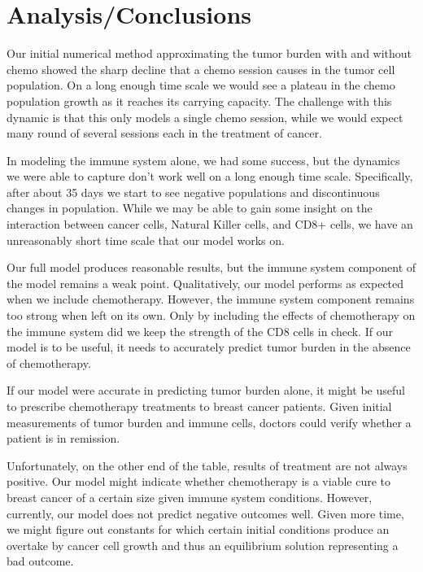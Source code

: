 \documentclass[11pt]{amsart}
\begin{document}
\section{Analysis/Conclusions}

Our initial numerical method approximating the tumor burden with and without chemo showed the sharp decline that a chemo session causes in the tumor cell population. 
On a long enough time scale we would see a plateau in the chemo population growth as it reaches its carrying capacity. 
The challenge with this dynamic is that this only models a single chemo session, 
while we would expect many round of several sessions each in the treatment of cancer.

In modeling the immune system alone, we had some success, 
but the dynamics we were able to capture don't work well on a long enough time scale. 
Specifically, after about 35 days we start to see negative populations and discontinuous changes 
in population. While we may be able to gain some insight on the interaction between cancer cells, 
Natural Killer cells, and CD8+ cells, we have an unreasonably short time scale that our model works on. 

Our full model produces reasonable results, but the immune system component of the model remains a weak point. Qualitatively, our model performs as expected when we include chemotherapy. However, the immune system component remains too strong when left on its own. Only by including the effects of chemotherapy on the immune system did we keep the strength of the CD8 cells in check. If our model is to be useful, it needs to accurately predict tumor burden in the absence of chemotherapy.

If our model were accurate in predicting tumor burden alone, it might be useful to prescribe chemotherapy treatments to breast cancer patients. Given initial measurements of tumor burden and immune cells, doctors could verify whether a patient is in remission. 

Unfortunately, on the other end of the table, results of treatment are not always positive. Our model might indicate whether chemotherapy is a viable cure to breast cancer of a certain size given immune system conditions. However, currently, our model does not predict negative outcomes well. Given more time, we might figure out constants for which certain initial conditions produce an overtake by cancer cell growth and thus an equilibrium solution representing a bad outcome.
\end{document}
